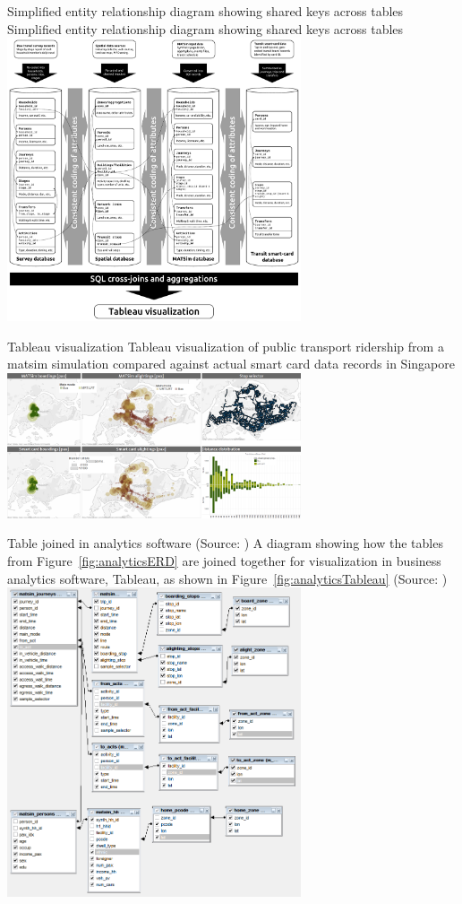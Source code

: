 \createfigure%
{Simplified entity relationship diagram showing shared keys across tables}%
{Simplified entity relationship diagram showing shared keys across tables}%
{\label{fig:analyticsERD}}%
{\includegraphics[width=0.65\textwidth, angle=0]{extending/figures/businessanalytics/schema}}%
{}

\createfigure%
{Tableau visualization}%
{Tableau visualization of public transport ridership from a \protect\gls{matsim} simulation compared against actual smart card data records in Singapore}%
{\label{fig:analyticsTableau}}%
{\includegraphics[width=0.65\textwidth, angle=0]{extending/figures/businessanalytics/tableau.png}}%
{}

\createfigure%
{Table joined in analytics software (Source: \citep{ErathEtAl_EASTS_2013})}%
{A diagram showing how the tables from Figure~\ref{fig:analyticsERD} are joined together for visualization in business analytics software, \eg Tableau, as shown in Figure~\ref{fig:analyticsTableau} (Source: \citep{ErathEtAl_EASTS_2013})}%
{\label{fig:analyticsJoin}}%
{\includegraphics[width=0.65\textwidth, angle=0]{extending/figures/businessanalytics/join}}%
{}

